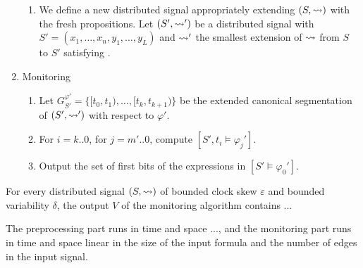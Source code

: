 \begin{enumerate}
\begin{enumerate}[label=\arabic*.]
		\item
		We define a new distributed signal appropriately extending $(S,{\rightsquigarrow})$ with the fresh propositions.
		Let $(S', {\rightsquigarrow}')$ be a distributed signal with $S' = (x_1, \ldots, x_n, y_1, \ldots, y_L)$ and ${\rightsquigarrow}'$ the smallest extension of ${\rightsquigarrow}$ from $S$ to $S'$ satisfying . 
		
	\end{enumerate}

	\item Monitoring
	\begin{enumerate}[label=\arabic*.]
		\item
		Let $G_{S'}^{\varphi'}= \{ [t_0, t_1), \ldots, [t_k, t_{k+1}) \}$ be the extended canonical segmentation of $(S', {\rightsquigarrow}')$ with respect to $\varphi'$.
		
		\item
		For $i = k .. 0$, for $j = m' .. 0$, compute $[S', t_i \models \varphi_j']$. 
		
		\item
		Output the set of first bits of the expressions in $[S' \models \varphi_0']$.
	\end{enumerate}
\end{enumerate}

\begin{claim}
	For every distributed signal $(S, {\rightsquigarrow})$ of bounded clock skew $\varepsilon$ and bounded variability $\delta$, the output $V$ of the monitoring algorithm contains ... %
\end{claim}

\begin{claim}
	The preprocessing part runs in time and space ..., and the monitoring part runs in time and space linear in the size of the input formula and the number of edges in the input signal. 
\end{claim}